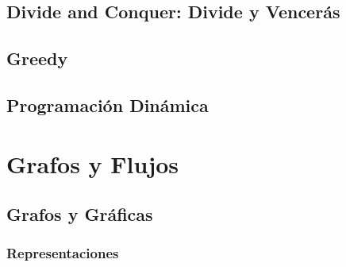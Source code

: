 \documentclass[12pt, fleqn]{report}                             %
\theoremstyle{break}                                            %
\begin{document}
    \chapter{Divide and Conquer: Divide y Vencerás}


    \clearpage
    \chapter{Greedy}

    \clearpage
    \chapter{Programación Dinámica}


\part{Grafos y Flujos}

    \chapter{Grafos y Gráficas}    

        \section{Representaciones}
\end{document}
